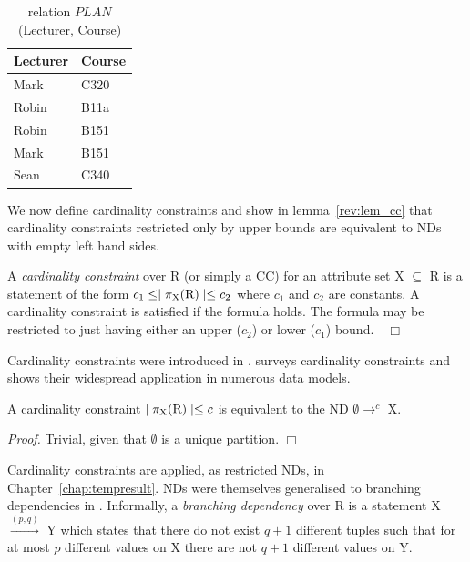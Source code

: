 {\line
\begin{table}[ht]
\begin{center}
\begin{tabular}{||l|l||} \hline
{\bf Lecturer} & {\bf Course} \\ \hline
 Mark &  C320 \\
 Robin & B11a \\
 Robin & B151 \\ 
 Mark  & B151 \\ 
 Sean  & C340 \\ \hline
\end{tabular}
\end{center}
\caption{\label{tbl:1.0} relation $PLAN$(Lecturer, Course)} 
\end{table}
}

We now define cardinality constraints and show in
lemma~\ref{rev:lem_cc} that cardinality constraints restricted only by
upper bounds are equivalent to NDs with empty left hand sides.


\begin{definition}
\begin{rm}
A {\em cardinality constraint} over R (or simply a CC) for an
attribute set X $\subseteq$ R
is a statement of the form $c_1 \le \mid \pi_{\rm X}({\rm R}) \mid \le
c_2$ where 
$c_1$ and $c_2$ are constants. A cardinality constraint is satisfied
if the formula holds. The formula may be restricted to just having
either an upper ($c_2$) or lower ($c_1$) bound.$\quad\Box$
\end{rm}
\end{definition}
\medskip

Cardinality constraints were introduced in \cite{kan80}. \cite{lew93}
surveys cardinality constraints and shows their widespread application
in numerous data models. 

\begin{lemma}\label{rev:lem_cc}
\begin{rm}
A cardinality constraint $\mid \pi_{\rm X}({\rm R}) \mid \le c$ is
equivalent to 
the ND $\emptyset \to^c$ X.
\end{rm}
\end{lemma}


{\em Proof.} Trivial, given that $\emptyset$ is a unique
partition. $\Box$

Cardinality constraints are applied, as restricted NDs, in
Chapter~\ref{chap:tempresult}. NDs were themselves generalised to branching
dependencies in \cite{dks92}. Informally, a {\em branching dependency}
over R 
is a statement X $\stackrel{(p,q)}{\rightarrow}$ Y which
states that there do not exist $q+1$ different tuples such that for at
most $p$ different values on X there are not $q+1$ different values on
Y. 

